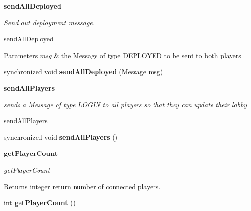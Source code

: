 \begin{Indent}{\bf send\+All\+Deployed}\par
{\em Send out deployment message.

send\+All\+Deployed


\begin{DoxyParams}{Parameters}
{\em msg} & the Message of type D\+E\+P\+L\+O\+Y\+E\+D to be sent to both players \\
\hline
\end{DoxyParams}
}\begin{DoxyCompactItemize}
\item 
\hypertarget{classbattleship_1_1network_1_1Server_ac96240a3bfd691ea65f958ceb7605bbf}{}synchronized void {\bfseries send\+All\+Deployed} (\hyperlink{classbattleship_1_1game_1_1Message}{Message} msg)\label{classbattleship_1_1network_1_1Server_ac96240a3bfd691ea65f958ceb7605bbf}

\end{DoxyCompactItemize}
\end{Indent}
\begin{Indent}{\bf send\+All\+Players}\par
{\em sends a Message of type L\+O\+G\+I\+N to all players so that they can update their lobby

send\+All\+Players }\begin{DoxyCompactItemize}
\item 
\hypertarget{classbattleship_1_1network_1_1Server_a130cdfb2bb6f46c44d3235a7d5a8d8be}{}synchronized void {\bfseries send\+All\+Players} ()\label{classbattleship_1_1network_1_1Server_a130cdfb2bb6f46c44d3235a7d5a8d8be}

\end{DoxyCompactItemize}
\end{Indent}
\begin{Indent}{\bf get\+Player\+Count}\par
{\em get\+Player\+Count

\begin{DoxyReturn}{Returns}
integer return number of connected players. 
\end{DoxyReturn}
}\begin{DoxyCompactItemize}
\item 
\hypertarget{classbattleship_1_1network_1_1Server_ae9c3b4c8de669eed7573a6e4d9017926}{}int {\bfseries get\+Player\+Count} ()\label{classbattleship_1_1network_1_1Server_ae9c3b4c8de669eed7573a6e4d9017926}

\end{DoxyCompactItemize}
\end{Indent}
